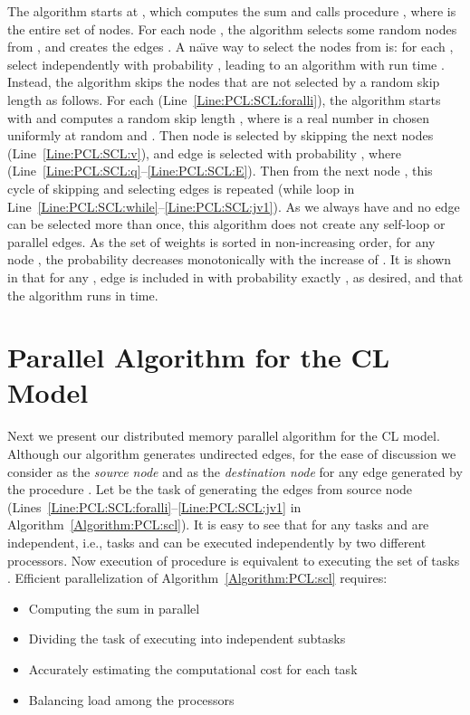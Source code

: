 \documentclass[conference,letterpaper,10pt]{IEEEtran}
\begin{document}
The algorithm starts at  , which computes the sum  and calls procedure , where  is the entire set of nodes. For each node , the algorithm selects some random nodes  from , and creates the edges . A na\"{\i}ve way to select the nodes  from  is: for each , select  independently with probability , leading to an algorithm with run time . Instead, the algorithm skips the nodes that are not selected by a random skip length  as follows. 
For each  (Line~\ref{Line:PCL:SCL:foralli}),
the algorithm starts with  and computes a random skip length , where  is a real number in  chosen uniformly at random and . Then node  is selected by skipping the next  nodes (Line~\ref{Line:PCL:SCL:v}), and edge  is selected with probability , where  (Line~\ref{Line:PCL:SCL:q}--\ref{Line:PCL:SCL:E}). Then from the next node , this cycle of skipping and selecting edges is repeated (while loop in Line~\ref{Line:PCL:SCL:while}--\ref{Line:PCL:SCL:jv1}). 
As we always have  and no edge  can be selected more than once, this algorithm does not create any self-loop or parallel edges.
As the set of weights  is sorted in non-increasing order, for any node , the probability  decreases monotonically with the increase of . It is shown in \cite{Miller2011} that for any , edge  is included in  with probability exactly , as desired, and that the algorithm runs in  time.

\section{Parallel Algorithm for the CL Model}
\label{Section:TimeEfficient}
Next we present our distributed memory parallel algorithm for the CL model.  Although our algorithm generates undirected edges, for the ease of discussion we consider  as the \emph{source node} and  as the \emph{destination node} for any edge  generated by the procedure . 
Let  be the task of generating the edges from source node  (Lines~\ref{Line:PCL:SCL:foralli}--\ref{Line:PCL:SCL:jv1} in Algorithm~\ref{Algorithm:PCL:scl}). It is easy to see that for any  tasks  and  are independent, i.e., tasks  and  can be executed independently by two different processors. Now execution of procedure  is equivalent to executing the set of tasks .  Efficient parallelization of Algorithm~\ref{Algorithm:PCL:scl} requires:

\begin{itemize}
\item Computing the sum  in parallel
\item Dividing the  task of executing  into independent subtasks
\item Accurately estimating the computational cost for each task
\item Balancing load among the processors 
\end{itemize}
\end{document}
